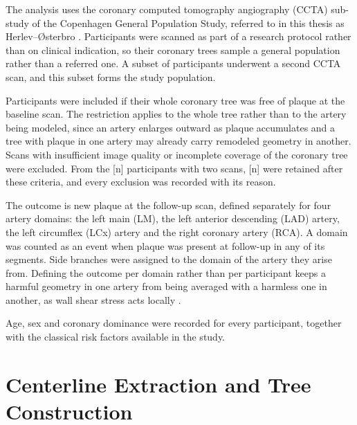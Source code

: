 The analysis uses the coronary computed tomography angiography (CCTA) sub-study of the
Copenhagen General Population Study, referred to in this thesis as Herlev--{\O}sterbro
\cite{fuchs2023cgps}.
Participants were scanned as part of a research protocol rather than on clinical indication, so
their coronary trees sample a general population rather than a referred one.
A subset of participants underwent a second CCTA scan, and this subset forms the study population.

Participants were included if their whole coronary tree was free of plaque at the baseline scan.
The restriction applies to the whole tree rather than to the artery being modeled, since an
artery enlarges outward as plaque accumulates \cite{glagov1987remodeling} and a tree with plaque
in one artery may already carry remodeled geometry in another.
Scans with insufficient image quality or incomplete coverage of the coronary tree were excluded.
From the [n] participants with two scans, [n] were retained after these criteria, and every
exclusion was recorded with its reason.

The outcome is new plaque at the follow-up scan, defined separately for four artery domains: the
left main (LM), the left anterior descending (LAD) artery, the left circumflex (LCx) artery and
the right coronary artery (RCA).
A domain was counted as an event when plaque was present at follow-up in any of its segments.
Side branches were assigned to the domain of the artery they arise from.
Defining the outcome per domain rather than per participant keeps a harmful geometry in one artery
from being averaged with a harmless one in another, as wall shear stress acts locally
\cite{chatzizisis2007ess}.

Age, sex and coronary dominance were recorded for every participant, together with the classical
risk factors available in the study.




\section{Centerline Extraction and Tree Construction}
\label{sec:method-tree}

